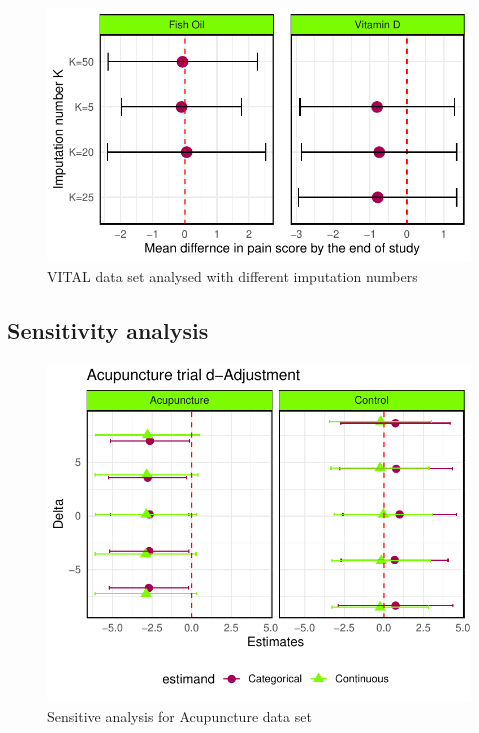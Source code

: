 \documentclass{article}
\newcommand{\pandocbounded}[1]{#1}
\begin{document}
\begin{figure}
\centering
\pandocbounded{\includegraphics[keepaspectratio]{Final_Report_files/figure-latex/unnamed-chunk-32-1.pdf}}
\caption{VITAL data set analysed with different imputation numbers}
\end{figure}

\subsection{Sensitivity analysis}\label{sensitivity-analysis}

\begin{figure}
\centering
\pandocbounded{\includegraphics[keepaspectratio]{Final_Report_files/figure-latex/unnamed-chunk-33-1.pdf}}
\caption{Sensitive analysis for Acupuncture data set}
\end{figure}
\end{document}
